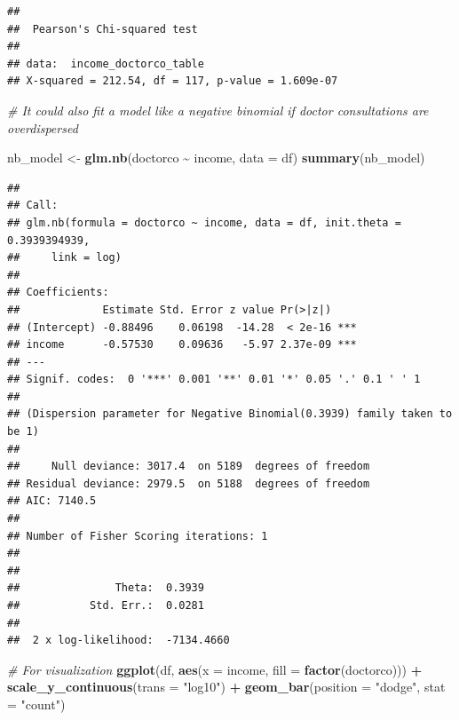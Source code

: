 \documentclass[
]{article}
\newenvironment{Shaded}{\begin{snugshade}}{\end{snugshade}}
\newcommand{\AttributeTok}[1]{\textcolor[rgb]{0.13,0.29,0.53}{#1}}
\newcommand{\CommentTok}[1]{\textcolor[rgb]{0.56,0.35,0.01}{\textit{#1}}}
\newcommand{\FunctionTok}[1]{\textcolor[rgb]{0.13,0.29,0.53}{\textbf{#1}}}
\newcommand{\NormalTok}[1]{#1}
\newcommand{\OtherTok}[1]{\textcolor[rgb]{0.56,0.35,0.01}{#1}}
\newcommand{\SpecialCharTok}[1]{\textcolor[rgb]{0.81,0.36,0.00}{\textbf{#1}}}
\newcommand{\StringTok}[1]{\textcolor[rgb]{0.31,0.60,0.02}{#1}}
\begin{document}
\begin{verbatim}
## 
##  Pearson's Chi-squared test
## 
## data:  income_doctorco_table
## X-squared = 212.54, df = 117, p-value = 1.609e-07
\end{verbatim}

\begin{Shaded}
\begin{Highlighting}[]
\CommentTok{\# It could also fit a model like a negative binomial if doctor consultations are overdispersed}

\NormalTok{nb\_model }\OtherTok{\textless{}{-}} \FunctionTok{glm.nb}\NormalTok{(doctorco }\SpecialCharTok{\textasciitilde{}}\NormalTok{ income, }\AttributeTok{data =}\NormalTok{ df)}
\FunctionTok{summary}\NormalTok{(nb\_model)}
\end{Highlighting}
\end{Shaded}

\begin{verbatim}
## 
## Call:
## glm.nb(formula = doctorco ~ income, data = df, init.theta = 0.3939394939, 
##     link = log)
## 
## Coefficients:
##             Estimate Std. Error z value Pr(>|z|)    
## (Intercept) -0.88496    0.06198  -14.28  < 2e-16 ***
## income      -0.57530    0.09636   -5.97 2.37e-09 ***
## ---
## Signif. codes:  0 '***' 0.001 '**' 0.01 '*' 0.05 '.' 0.1 ' ' 1
## 
## (Dispersion parameter for Negative Binomial(0.3939) family taken to be 1)
## 
##     Null deviance: 3017.4  on 5189  degrees of freedom
## Residual deviance: 2979.5  on 5188  degrees of freedom
## AIC: 7140.5
## 
## Number of Fisher Scoring iterations: 1
## 
## 
##               Theta:  0.3939 
##           Std. Err.:  0.0281 
## 
##  2 x log-likelihood:  -7134.4660
\end{verbatim}

\begin{Shaded}
\begin{Highlighting}[]
\CommentTok{\# For visualization}
\FunctionTok{ggplot}\NormalTok{(df, }\FunctionTok{aes}\NormalTok{(}\AttributeTok{x =}\NormalTok{ income, }\AttributeTok{fill =} \FunctionTok{factor}\NormalTok{(doctorco))) }\SpecialCharTok{+} 
  \FunctionTok{scale\_y\_continuous}\NormalTok{(}\AttributeTok{trans =} \StringTok{"log10"}\NormalTok{) }\SpecialCharTok{+}
  \FunctionTok{geom\_bar}\NormalTok{(}\AttributeTok{position =} \StringTok{"dodge"}\NormalTok{, }\AttributeTok{stat =} \StringTok{"count"}\NormalTok{)}
\end{Highlighting}
\end{Shaded}
\end{document}
